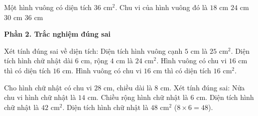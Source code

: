 \begin{ex} %
Một hình vuông có diện tích $36\text{ cm}^2$. Chu vi của hình vuông đó là
\choice
{$18\text{ cm}$}
{\True $24\text{ cm}$}
{$30\text{ cm}$}
{$36\text{ cm}$}
\end{ex}

\textbf{Phần 2. Trắc nghiệm đúng sai}

\begin{ex} %
Xét tính đúng sai về diện tích:
\choiceTF
{\True Diện tích hình vuông cạnh $5\text{ cm}$ là $25\text{ cm}^2$.}
{\True Diện tích hình chữ nhật dài $6\text{ cm}$, rộng $4\text{ cm}$ là $24\text{ cm}^2$.}
{Hình vuông có chu vi $16\text{ cm}$ thì có diện tích $16\text{ cm}$.}
{\True Hình vuông có chu vi $16\text{ cm}$ thì có diện tích $16\text{ cm}^2$.}
\end{ex}

\begin{ex} %
Cho hình chữ nhật có chu vi $28\text{ cm}$, chiều dài là $8\text{ cm}$. Xét tính đúng sai:
\choiceTF
{\True Nửa chu vi hình chữ nhật là $14\text{ cm}$.}
{\True Chiều rộng hình chữ nhật là $6\text{ cm}$.}
{Diện tích hình chữ nhật là $42\text{ cm}^2$.}
{\True Diện tích hình chữ nhật là $48\text{ cm}^2$ ($8 \times 6 = 48$).}
\end{ex}

